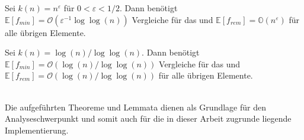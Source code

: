 \begin{manualtheorem}{4}\label{theo: min_4}
Sei $k(n)=n^{\varepsilon}$ für $0<\varepsilon<1/2$. Dann benötigt \Rm $\mathbb{E}[f_{min}]=\mathcal{O}(\varepsilon^{-1}\log\log(n))$ Vergleiche für das \mE und $\mathbb{E}[f_{rem}]=\mathbb{O}(n^{\varepsilon})$ für alle übrigen Elemente.
\end{manualtheorem}
\begin{manualtheorem}{5}\label{theo: min_5}
Sei $k(n)=\log(n)/\log\log(n)$. Dann benötigt \Rm $\mathbb{E}[f_{min}]=\mathcal{O}(\log(n)/\log\log(n))$ Vergleiche für das \mE und $\mathbb{E}[f_{rem}]=\mathcal{O}(\log(n)/\log\log(n))$ für alle übrigen Elemente.
\end{manualtheorem}

\noindent\makebox[\linewidth]{\color{gray}{\hdashrule[0.5ex]{\linewidth}{0.5pt}{1.5mm}}}\\[.05cm]
\noindent
Die aufgeführten Theoreme und Lemmata dienen als Grundlage für den Analyseschwerpunkt und somit auch für die in dieser Arbeit zugrunde liegende Implementierung. 











